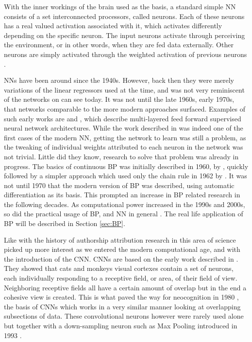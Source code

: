 With the inner workings of the brain used as the basis, a standard simple
\gls{NN} consists of a set interconnected processors, called neurons. Each of
these neurons has a real valued activation associated with it, which activates
differently depending on the specific neuron. The input neurons activate
through perceiving the environment, or in other words, when they are fed data
externally. Other neurons are simply activated through the weighted activation
of previous neurons \citep{DBLP:journals/corr/Schmidhuber14}.

\glspl{NN} have been around since the 1940s. However, back then they were
merely variations of the linear regressors used at the time, and was not
very reminiscent of the networks on can see today. It was not until the late
1960s, early 1970s, that networks comparable to the more modern approaches
surfaced. Examples of such early works are \citep{ivakhnenko1973cybernetic} and
\citep{4308320}, which describe multi-layered feed forward supervised neural
network architectures. While the work described in \citep{4308320} was indeed
one of the first cases of the modern \gls{NN}, getting the network to learn was
still a problem, as the tweaking of individual weights attributed to each neuron
in the network was not trivial. Little did they know, research to solve that
problem was already in progress. The basics of continuous \gls{BP} was initially
described in 1960, by \citet{Kelley1960}, quickly followed by a simpler approach
which used only the chain rule in 1962 by \citet{DREYFUS196230}. It was not
until 1970 that the modern version of \gls{BP} was described, using automatic
differentiation as its basis. This prompted an increase in \gls{BP} related
research in the following decades. As computational power increased in the
1990s and 2000s, so did the practical usage of \gls{BP}, and \gls{NN} in
general \citep{Schmidhuber:2015}. The real life application of \gls{BP} will be
described in Section \ref{sec:BP}.

Like with the history of authorship attribution research in this area of science
picked up more interest as we entered the modern computational age, and with
the introduction of the \gls{CNN}. \glspl{CNN} are based on the early work
described in \citet{TJP:TJP19681951215}. They showed that cats and monkeys
visual cortexes contain a set of neurons, each individually responding to a
receptive field, or area, of their field of view. Neighboring receptive fields
all have a certain amount of overlap but in the end a cohesive view is created.
This is what paved the way for neocognition in 1980 \citep{Fukushima1980}, the
basis of \glspl{CNN} which works in a very similar manner looking at overlapping
subsections of data. These convolutional neurons however were rarely used alone
but together with a down-sampling neuron such as Max Pooling introduced in 1993
\citep{Schmidhuber:2015}.


